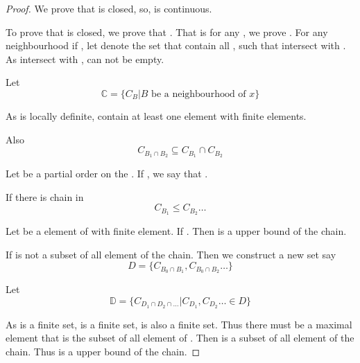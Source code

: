 \begin{enumerate}
\begin{proof}
            We prove that  is closed, so,  is continuous.

            To prove that  is closed, we prove that . That is for any , we prove . For any neighbourhood  if , let  denote the set that contain all \mt{\alpha}, such that  intersect with . As  intersect with ,  can not be empty.

            Let 
            \begin{equation*}
                  \mathbb{C} = \{ C_{B} | B \text{ be a neighbourhood of } x \}
            \end{equation*}

            As  is locally definite,  contain at least one element with finite elements.

            Also
            \begin{equation*}
                  C_{B_{1} \cap B_{2}} \subseteq C_{B_{1}} \cap C_{B_{2}}
            \end{equation*}
            
            Let \mt{\le} be a partial order on the . If , we say that .

            If there is chain in 
            \begin{equation*}
                  C_{B_{1}} \le C_{B_{2}} \dots
            \end{equation*}

            Let  be a element of  with finite element. If . Then  is a upper bound of the chain.

            If  is not a subset of all element of the chain. Then we construct a new set say 
            \begin{equation*}
                  D = \{ C_{B_{0} \cap B_{1}}, C_{B_{0} \cap B_{2}} \dots \}
            \end{equation*}

            Let
            \begin{equation*}
                  \mathbb{D} = \{ C_{D_{1} \cap D_{2} \cap \dots } | C_{D_1}, C_{D_2}\dots \in D \}
            \end{equation*}

            As  is a finite set,  is a finite set,  is also a finite set. Thus there must be a maximal element  that is the subset of all element of . Then  is a subset of all element of the chain. Thus  is a upper bound of the chain.


\end{proof}
\end{enumerate}
